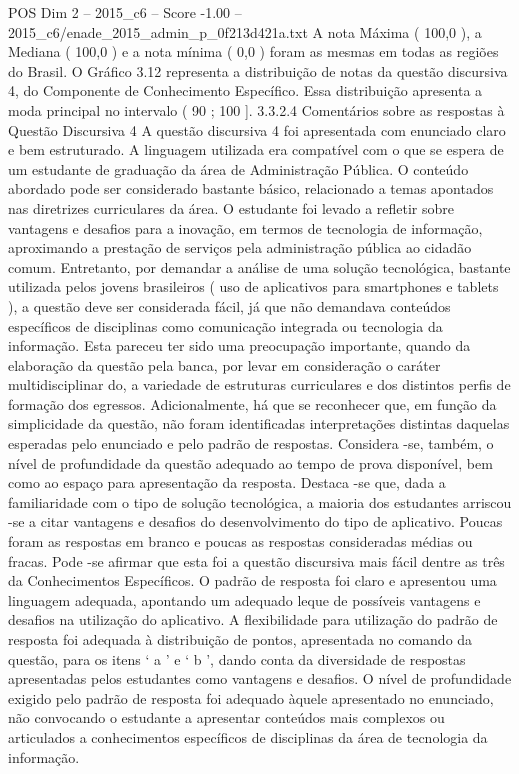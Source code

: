 \begin{textsample}{POS Dim 2 – 2015\_c6 – Score -1.00 – 2015\_c6/enade\_2015\_admin\_p\_0f213d421a.txt}
A nota Máxima ( 100,0 ), a Mediana ( 100,0 ) e a nota mínima ( 0,0 ) foram as mesmas em todas as regiões do Brasil.
O Gráfico 3.12 representa a distribuição de notas da questão discursiva 4, do Componente de Conhecimento Específico.
Essa distribuição apresenta a moda principal no intervalo ( 90 ; 100 ]. 3.3.2.4 Comentários sobre as respostas à Questão Discursiva 4 A questão discursiva 4 foi apresentada com enunciado claro e bem estruturado.
A linguagem utilizada era compatível com o que se espera de um estudante de graduação da área de Administração Pública.
O conteúdo abordado pode ser considerado bastante básico, relacionado a temas apontados nas diretrizes curriculares da área.
O estudante foi levado a refletir sobre vantagens e desafios para a inovação, em termos de tecnologia de informação, aproximando a prestação de serviços pela administração pública ao cidadão comum.
Entretanto, por demandar a análise de uma solução tecnológica, bastante utilizada pelos jovens brasileiros ( uso de aplicativos para smartphones e tablets ), a questão deve ser considerada fácil, já que não demandava conteúdos específicos de disciplinas como comunicação integrada ou tecnologia da informação.
Esta pareceu ter sido uma preocupação importante, quando da elaboração da questão pela banca, por levar em consideração o caráter multidisciplinar do, a variedade de estruturas curriculares e dos distintos perfis de formação dos egressos.
Adicionalmente, há que se reconhecer que, em função da simplicidade da questão, não foram identificadas interpretações distintas daquelas esperadas pelo enunciado e pelo padrão de respostas.
Considera -se, também, o nível de profundidade da questão adequado ao tempo de prova disponível, bem como ao espaço para apresentação da resposta.
Destaca -se que, dada a familiaridade com o tipo de solução tecnológica, a maioria dos estudantes arriscou -se a citar vantagens e desafios do desenvolvimento do tipo de aplicativo.
Poucas foram as respostas em branco e poucas as respostas consideradas médias ou fracas.
Pode -se afirmar que esta foi a questão discursiva mais fácil dentre as três da Conhecimentos Específicos.
O padrão de resposta foi claro e apresentou uma linguagem adequada, apontando um adequado leque de possíveis vantagens e desafios na utilização do aplicativo.
A flexibilidade para utilização do padrão de resposta foi adequada à distribuição de pontos, apresentada no comando da questão, para os itens ‘ a ’ e ‘ b ’, dando conta da diversidade de respostas apresentadas pelos estudantes como vantagens e desafios.
O nível de profundidade exigido pelo padrão de resposta foi adequado àquele apresentado no enunciado, não convocando o estudante a apresentar conteúdos mais complexos ou articulados a conhecimentos específicos de disciplinas da área de tecnologia da informação.

\end{textsample}
